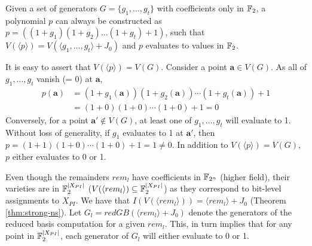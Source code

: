 \begin{Proposition}\label{prop:singpoly}
Given a set of generators $G = \{g_1,\dots,g_t\}$ with coefficients only in ${\mathbb{F}}_2$, a polynomial
$p$ can always be constructed as $p = ((1+g_1)(1+g_2)\dots(1+g_t)+1)$, such that 
$V(\langle p\rangle) = V(\langle g_1,\dots,g_t\rangle+J_0)$ and $p$ evaluates 
to values in ${\mathbb{F}}_2$.
\end{Proposition}
It is easy to assert that $V(\langle p \rangle) = V(G)$. 
Consider a point $\bm{a} \in V(G)$. As all of 
$g_1,\dots,g_t$ vanish (= 0) at $\bm{a}$,
\begin{align*}
p(\bm{a}) &= (1+g_1(\bm{a}))(1+g_2(\bm{a}))\cdots(1+g_t(\bm{a}))+1 \\
&= (1+0)(1+0)\cdots(1+0) + 1 = 0
\end{align*}
Conversely, for a point $\bm{a'} \not \in V(G)$, at least one  
of $g_1,\dots,g_t$ will evaluate to 1. 
Without loss of generality, if
$g_1$ evaluates to 1 at $\bm{a'}$, then $p=(1+1)(1+0)\cdots(1+0)+1 = 1 \neq
0$. In addition to $V(\langle p\rangle) = V(G)$, $p$ either evaluates to 0 or 1. 


Even though the remainders $rem_l$ have coefficients in ${\mathbb{F}}_{2^n}$ (higher field), their varieties 
are in ${\mathbb{F}}_{2}^{|X_{PI}|}$ ($V(\langle rem_l\rangle)\subseteq {\mathbb{F}}_2^{|X_{PI}|}$) as they correspond to 
bit-level assignments to $X_{PI}$.
We have that $I(V(\langle rem_l\rangle)) = \langle rem_l \rangle + J_0$ (Theorem \ref{thm:strong-ns}).
Let $G_l=redGB(\langle rem_l \rangle + J_0 )$
denote the generators of the reduced \Grobner basis computation for a given $rem_l$.
This, in turn implies that for 
any point in ${\mathbb{F}}_2^{|X_{PI}|}$, each generator of $G_l$ will either evaluate to 0 or 1.

